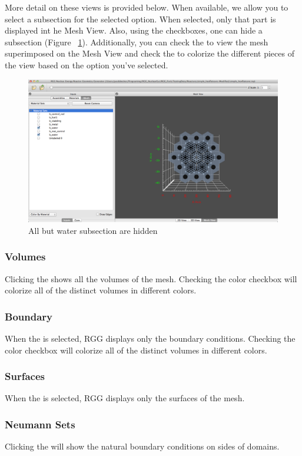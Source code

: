 More detail on these views is provided below.  When available, we allow you to select a subsection for the selected option.  When selected, only that part is displayed int he Mesh View.  Also, using the checkboxes, one can hide a subsection (Figure ~\ref{fig:subsectionMesh}).  Additionally, you can check the  to view the mesh superimposed on the Mesh View and check the  to colorize the different pieces of the view based on the option you've selected.

\begin{figure}[h]
	\begin{center}
		\includegraphics[width=0.5\linewidth]{Images/mesh-selection.png}
		\caption{All but water subsection are hidden}
		\label{fig:subsectionMesh}
	\end{center}
\end{figure}

\subsubsection{Volumes}
Clicking the  shows all the volumes of the mesh.  Checking the color checkbox will colorize all of the distinct volumes in different colors.

\subsubsection{Boundary}
When the  is selected, RGG displays only the boundary conditions.  Checking the color checkbox will colorize all of the distinct volumes in different colors.

\subsubsection{Surfaces}
When the  is selected, RGG displays only the surfaces of the mesh.

\subsubsection{Neumann Sets}
Clicking the  will show the natural boundary conditions on sides of domains.

